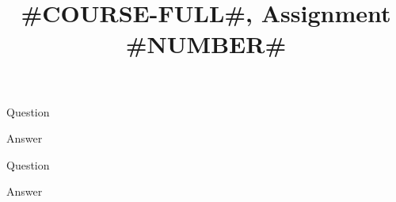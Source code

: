 \documentclass[a4paper]{article}
\title{#COURSE-FULL#, Assignment #NUMBER#}
\begin{document}
\maketitle

\setlength{\parindent}{0em}
\setlength{\parskip}{1em}


\begin{questionbody}
Question
\end{questionbody}

Answer



\begin{questionbody}
Question
\end{questionbody}

Answer

\end{document}
